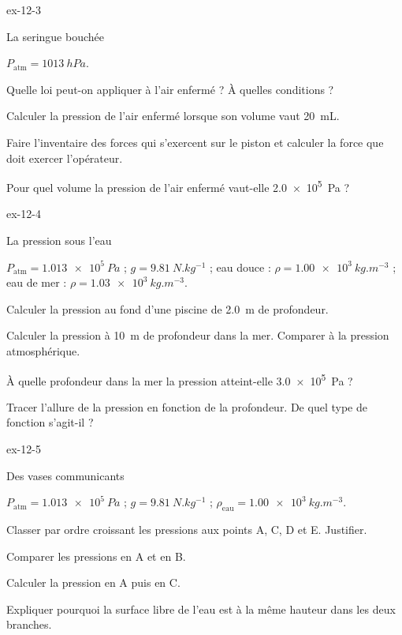 \begin{blocLivre}{ex-12-3}
\begin{exercice}[1]{La seringue bouchée}
\begin{donnees}
$P_\mathrm{atm}=\qty{1013}{hPa}$.
\end{donnees}
\begin{questions}
\item Quelle loi peut-on appliquer à l'air enfermé ? À quelles conditions ?
\item Calculer la pression de l'air enfermé lorsque son volume vaut \qty{20}{mL}.
\item Faire l'inventaire des forces qui s'exercent sur le piston et calculer la force que doit exercer l'opérateur.
\item Pour quel volume la pression de l'air enfermé vaut-elle \qty{2,0e5}{Pa} ?
\end{questions}
\end{exercice}
\end{blocLivre}
\begin{blocLivre}{ex-12-4}
\begin{exercice}[1]{La pression sous l'eau}
\begin{donnees}
$P_\mathrm{atm}=\qty{1,013e5}{Pa}$ ; $g=\qty{9,81}{N.kg^{-1}}$ ; eau douce : $\rho=\qty{1,00e3}{kg.m^{-3}}$ ; eau de mer : $\rho=\qty{1,03e3}{kg.m^{-3}}$.
\end{donnees}
\begin{questions}
\item Calculer la pression au fond d'une piscine de \qty{2,0}{m} de profondeur.
\item Calculer la pression à \qty{10}{m} de profondeur dans la mer. Comparer à la pression atmosphérique.
\item À quelle profondeur dans la mer la pression atteint-elle \qty{3,0e5}{Pa} ?
\item Tracer l'allure de la pression en fonction de la profondeur. De quel type de fonction s'agit-il ?
\end{questions}
\end{exercice}
\end{blocLivre}
\begin{blocLivre}{ex-12-5}
\begin{exercice}[1]{Des vases communicants}
\begin{donnees}
$P_\mathrm{atm}=\qty{1,013e5}{Pa}$ ; $g=\qty{9,81}{N.kg^{-1}}$ ; $\rho_\mathrm{eau}=\qty{1,00e3}{kg.m^{-3}}$.
\end{donnees}
\begin{questions}
\item Classer par ordre croissant les pressions aux points A, C, D et E. Justifier.
\item Comparer les pressions en A et en B.
\item Calculer la pression en A puis en C.
\item Expliquer pourquoi la surface libre de l'eau est à la même hauteur dans les deux branches.
\end{questions}
\end{exercice}
\end{blocLivre}
